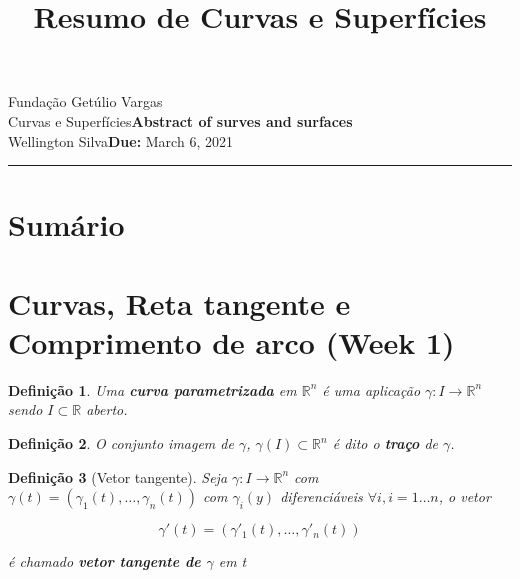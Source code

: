 \documentclass{article}
\title{Resumo de Curvas e Superfícies}
\author{}
\date{}
\newtheorem{definition}{Definição}
\newcommand{\assignment}{Abstract of surves and surfaces}
\newcommand{\duedate}{March 6, 2021}
\begin{document}
Fundação Getúlio Vargas\hfill\\
Curvas e Superfícies\hfill\textbf{\assignment}\\
Wellington Silva\hfill\textbf{Due:} \duedate\\
\smallskip\hrule\bigskip

{\let\newpage\relax\maketitle}
\maketitle

\section*{Sumário}

\textbf{}
\vspace{4.0mm}

\textbf{}
\vspace{4.0mm}

\textbf{}
\vspace{4.0mm}

\newpage

\section*{Curvas, Reta tangente e Comprimento de arco (Week 1)}
\label{s1}

\begin{definition}
Uma \textbf{curva parametrizada} em $\mathbb{R}^n$ é uma aplicação $\gamma: I \rightarrow \mathbb{R}^n$ sendo $I \subset \mathbb{R}$ aberto.
\end{definition}

\begin{definition}
O conjunto imagem de $\gamma$, $\gamma(I) \subset \mathbb{R}^n$ é dito o \textbf{traço} de $\gamma$.
\end{definition}

\begin{definition}[Vetor tangente]
Seja $\gamma: I \rightarrow \mathbb{R}^n$ com $\gamma(t) = (\gamma_1 (t), \ldots, \gamma_n (t))$ com $\gamma_i (y)$ diferenciáveis $\forall i, i = 1 \ldots n$, o vetor

$$\gamma'(t) = (\gamma'_1 (t), \ldots, \gamma'_n (t))$$

é chamado \textbf{vetor tangente de $\gamma$} em t
\end{definition}
\end{document}
